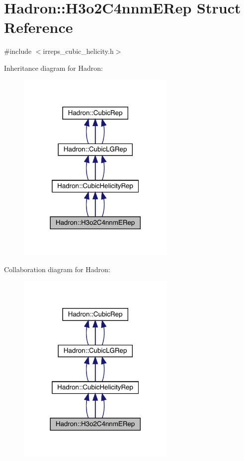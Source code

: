 \hypertarget{structHadron_1_1H3o2C4nnmERep}{}\section{Hadron\+:\+:H3o2\+C4nnm\+E\+Rep Struct Reference}
\label{structHadron_1_1H3o2C4nnmERep}


{\ttfamily \#include $<$irreps\+\_\+cubic\+\_\+helicity.\+h$>$}



Inheritance diagram for Hadron\+:
\nopagebreak
\begin{figure}[H]
\begin{center}
\leavevmode
\includegraphics[width=216pt]{d6/dcb/structHadron_1_1H3o2C4nnmERep__inherit__graph}
\end{center}
\end{figure}


Collaboration diagram for Hadron\+:
\nopagebreak
\begin{figure}[H]
\begin{center}
\leavevmode
\includegraphics[width=216pt]{db/d26/structHadron_1_1H3o2C4nnmERep__coll__graph}
\end{center}
\end{figure}
